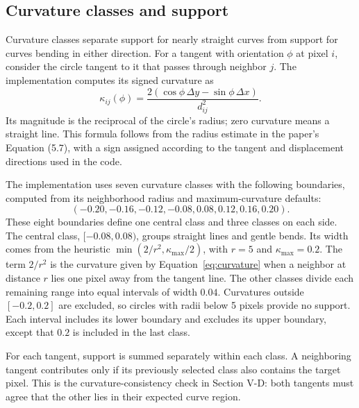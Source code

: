 \documentclass[10pt,letterpaper]{article}
\begin{document}
\subsection{Curvature classes and support}
Curvature classes separate support for nearly straight curves from support for
curves bending in either direction. For a tangent with orientation $\phi$ at
pixel $i$, consider the circle tangent to it that passes through neighbor $j$.
The implementation computes its signed curvature as
\begin{equation}
\kappa_{ij}(\phi)=
\frac{2(\cos\phi\,\Delta y-\sin\phi\,\Delta x)}{d_{ij}^2}.
\label{eq:curvature}
\end{equation}
Its magnitude is the reciprocal of the circle's radius; zero curvature means
a straight line. This formula follows from the radius estimate in the paper's
Equation (5.7), with a sign assigned according to the tangent and displacement
directions used in the code.

The implementation uses seven curvature classes with the following boundaries,
computed from its neighborhood radius and maximum-curvature defaults:
\begin{equation}
(-0.20,-0.16,-0.12,-0.08,0.08,0.12,0.16,0.20).
\end{equation}
These eight boundaries define one central class and three classes on each side.
The central class, $[-0.08,0.08)$, groups straight lines and gentle bends.
Its width comes from the heuristic
$\min(2/r^2,\kappa_{\max}/2)$, with $r=5$ and $\kappa_{\max}=0.2$.
The term $2/r^2$ is the curvature given by Equation~\eqref{eq:curvature}
when a neighbor at distance $r$ lies one pixel away from the tangent line.
The other classes divide each remaining range into equal intervals of width
$0.04$. Curvatures outside $[-0.2,0.2]$ are excluded, so circles with radii
below 5 pixels provide no support. Each interval includes its lower boundary
and excludes its upper boundary, except that $0.2$ is included in the last class.

For each tangent, support is summed separately within each class.
A neighboring tangent contributes only if its previously selected class also
contains the target pixel. This is the curvature-consistency check in
Section V-D: both tangents must agree that the other lies in their expected
curve region.
\end{document}
